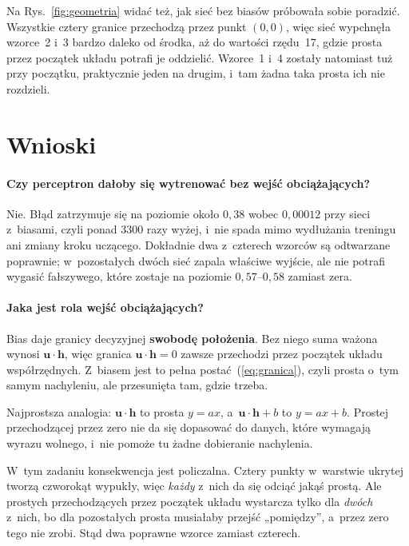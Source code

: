 \documentclass[12pt]{article}
\begin{document}
Na Rys.~\ref{fig:geometria} widać też, jak sieć bez biasów próbowała sobie
poradzić. Wszystkie cztery granice przechodzą przez punkt $(0,0)$, więc sieć
wypchnęła wzorce~2 i~3 bardzo daleko od środka, aż do wartości rzędu~17, gdzie
prosta przez początek układu potrafi je oddzielić. Wzorce~1 i~4 zostały
natomiast tuż przy początku, praktycznie jeden na drugim, i~tam żadna taka
prosta ich nie rozdzieli.

\section{Wnioski}

\paragraph{Czy perceptron dałoby się wytrenować bez wejść obciążających?}
Nie. Błąd zatrzymuje się na poziomie około $0{,}38$ wobec $0{,}00012$ przy
sieci z~biasami, czyli ponad 3300 razy wyżej, i~nie spada mimo wydłużania
treningu ani zmiany kroku uczącego. Dokładnie dwa z~czterech wzorców są
odtwarzane poprawnie; w~pozostałych dwóch sieć zapala właściwe wyjście, ale nie
potrafi wygasić fałszywego, które zostaje na poziomie $0{,}57$--$0{,}58$ zamiast
zera.

\paragraph{Jaka jest rola wejść obciążających?} Bias daje granicy decyzyjnej
\textbf{swobodę położenia}. Bez niego suma ważona wynosi $\mathbf{u}\cdot\mathbf{h}$, więc granica
$\mathbf{u}\cdot\mathbf{h} = 0$ zawsze przechodzi przez początek układu
współrzędnych. Z~biasem jest to pełna postać~(\ref{eq:granica}), czyli prosta
o~tym samym nachyleniu, ale przesunięta tam, gdzie trzeba.

Najprostsza analogia: $\mathbf{u}\cdot\mathbf{h}$ to prosta $y = ax$,
a~$\mathbf{u}\cdot\mathbf{h} + b$ to $y = ax + b$. Prostej przechodzącej przez
zero nie da się dopasować do danych, które wymagają wyrazu wolnego, i~nie pomoże
tu żadne dobieranie nachylenia.

W~tym zadaniu konsekwencja jest policzalna. Cztery punkty w~warstwie ukrytej
tworzą czworokąt wypukły, więc \emph{każdy} z~nich da się odciąć jakąś prostą.
Ale prostych przechodzących przez początek układu wystarcza tylko dla
\emph{dwóch} z~nich, bo dla pozostałych prosta musiałaby przejść „pomiędzy'',
a~przez zero tego nie zrobi. Stąd dwa poprawne wzorce zamiast czterech.
\end{document}
